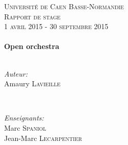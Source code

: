 \begin{titlepage}


\center %


\textsc{\LARGE Université de Caen Basse-Normandie}\\[1.5cm] %

\textsc{\Large Rapport de stage}\\[0.5cm] %
\textsc{1 avril 2015 - 30 septembre 2015}\\[0.5cm] %



\HRule \\[0.4cm]

{ \huge \bfseries Open orchestra}\\[0.4cm] %

\HRule \\[1.5cm]


\begin{minipage}{0.4\textwidth}
\begin{flushleft} \large
\emph{Auteur:}\\

Amaury \textsc{Lavieille}

\end{flushleft}
\end{minipage}
~
\begin{minipage}{0.4\textwidth}
\begin{flushright} \large
\emph{Enseignants:} \\
Marc \textsc{Spaniol}\\
Jean-Marc \textsc{Lecarpentier}
\end{flushright}
\end{minipage}\\[4cm]


\end{titlepage}
